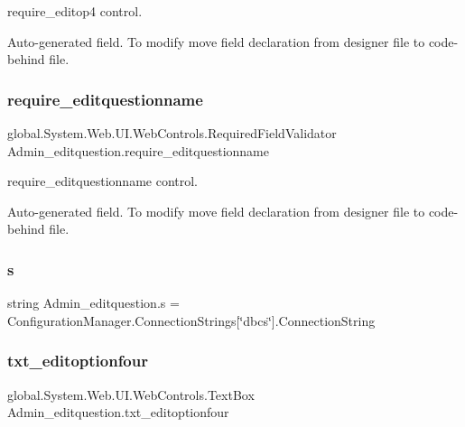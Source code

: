 require\+\_\+editop4 control. 

Auto-\/generated field. To modify move field declaration from designer file to code-\/behind file. \mbox{\label{class_admin__editquestion_a368bf7a308684901b9fe901cee1a0cb6}} 
\subsubsection{\texorpdfstring{require\_editquestionname}{require\_editquestionname}}
{\footnotesize\ttfamily global.\+System.\+Web.\+U\+I.\+Web\+Controls.\+Required\+Field\+Validator Admin\+\_\+editquestion.\+require\+\_\+editquestionname\hspace{0.3cm}{\ttfamily [protected]}}



require\+\_\+editquestionname control. 

Auto-\/generated field. To modify move field declaration from designer file to code-\/behind file. \mbox{\label{class_admin__editquestion_a8ce5225f9311e77dc1de98748a7f34dd}} 
\subsubsection{\texorpdfstring{s}{s}}
{\footnotesize\ttfamily string Admin\+\_\+editquestion.\+s = Configuration\+Manager.\+Connection\+Strings\mbox{[}\char`\"{}dbcs\char`\"{}\mbox{]}.Connection\+String\hspace{0.3cm}{\ttfamily [private]}}

\mbox{\label{class_admin__editquestion_a6ed5c7c4962ca805e2fc2f6658a4b190}} 
\subsubsection{\texorpdfstring{txt\_editoptionfour}{txt\_editoptionfour}}
{\footnotesize\ttfamily global.\+System.\+Web.\+U\+I.\+Web\+Controls.\+Text\+Box Admin\+\_\+editquestion.\+txt\+\_\+editoptionfour\hspace{0.3cm}{\ttfamily [protected]}}



